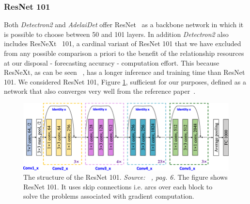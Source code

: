 \documentclass[10pt,twocolumn,letterpaper]{article}
\begin{document}
\subsubsection{ResNet 101}
Both \textit{Detectron2} and \textit{AdelaiDet} offer ResNet~\cite{Authors5_ResNet} as a backbone network in which it is possible to choose between 50 and 101 layers. In addition \textit{Detectron2} also includes ResNeXt~\cite{resxt} 101, a cardinal variant of ResNet 101 that we have excluded from any possible comparison a priori to the benefit of the relationship resources at our disposal - forecasting accuracy - computation effort. This because ResNeXt, as can be seen ~\cite{Authors1_maskrcnn, resxt}, has a longer inference and training time than ResNet 101.
We considered ResNet 101, Figure \ref{fig:resnet101}, sufficient for our purposes, defined as a network that also converges very well from the reference paper~\cite{Authors5_ResNet}.
\begin{figure}[H]
\centering
  \includegraphics[width=0.90\linewidth]{./image/resnet101.png} 
  \caption{The structure of the ResNet 101. \textit{Source: ~\cite{resnet101_img}, pag. 6.}
The figure shows ResNet 101. It uses skip connections i.e. arcs over each block to solve the problems associated with gradient computation.}%
  \label{fig:resnet101}
\noindent
\end{figure}
\end{document}
